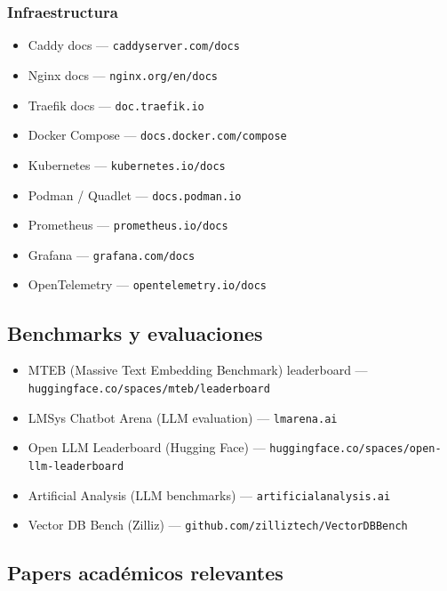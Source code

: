 \documentclass[11pt,a4paper]{article}
\begin{document}
\subsubsection{Infraestructura}
\begin{itemize}[leftmargin=*,itemsep=1pt]
\item Caddy docs — \texttt{caddyserver.com/docs}
\item Nginx docs — \texttt{nginx.org/en/docs}
\item Traefik docs — \texttt{doc.traefik.io}
\item Docker Compose — \texttt{docs.docker.com/compose}
\item Kubernetes — \texttt{kubernetes.io/docs}
\item Podman / Quadlet — \texttt{docs.podman.io}
\item Prometheus — \texttt{prometheus.io/docs}
\item Grafana — \texttt{grafana.com/docs}
\item OpenTelemetry — \texttt{opentelemetry.io/docs}
\end{itemize}

\subsection{Benchmarks y evaluaciones}

\begin{itemize}[leftmargin=*,itemsep=1pt]
\item MTEB (Massive Text Embedding Benchmark) leaderboard — \texttt{huggingface.co/spaces/mteb/leaderboard}
\item LMSys Chatbot Arena (LLM evaluation) — \texttt{lmarena.ai}
\item Open LLM Leaderboard (Hugging Face) — \texttt{huggingface.co/spaces/open-llm-leaderboard}
\item Artificial Analysis (LLM benchmarks) — \texttt{artificialanalysis.ai}
\item Vector DB Bench (Zilliz) — \texttt{github.com/zilliztech/VectorDBBench}
\end{itemize}

\subsection{Papers académicos relevantes}
\end{document}
